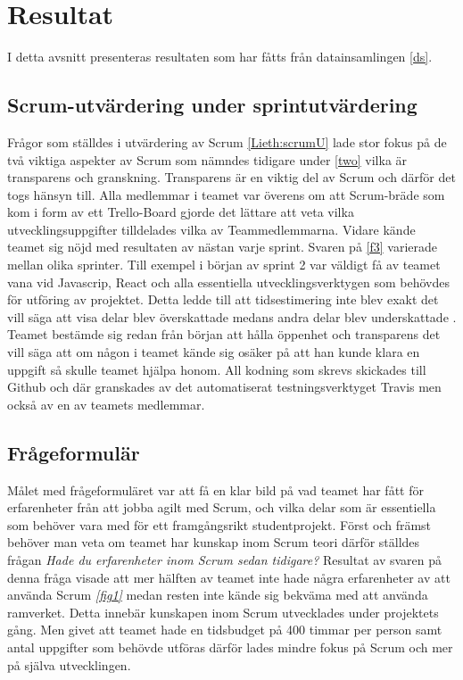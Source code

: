 \section{Resultat}
\label{sec:Lieth_Wahid-results}
I detta avsnitt presenteras resultaten som har fåtts från datainsamlingen \ref{ds}.
\subsection{Scrum-utvärdering under sprintutvärdering}
Frågor som ställdes i utvärdering av Scrum \ref{Lieth:scrumU} lade stor fokus på de två viktiga aspekter av Scrum som nämndes tidigare under \ref{two} vilka är transparens och granskning.
Transparens är en viktig del av Scrum och därför det togs hänsyn till. Alla medlemmar i teamet var överens om att Scrum-bräde som kom i form av ett Trello-Board gjorde det lättare att veta vilka 
utvecklingsuppgifter tilldelades vilka av Teammedlemmarna. Vidare kände teamet sig nöjd med resultaten av nästan varje sprint. Svaren på \ref{f3} varierade mellan olika sprinter. Till exempel i början av sprint 2 var väldigt få av teamet  
vana vid Javascrip, React och alla essentiella utvecklingsverktygen som behövdes för utföring av projektet. Detta ledde till att tidsestimering inte blev exakt det vill säga att visa delar blev överskattade medans andra delar blev underskattade  . Teamet bestämde sig redan från
början att hålla öppenhet och transparens det vill säga att om någon i teamet kände sig osäker på att han kunde klara en uppgift så skulle teamet hjälpa honom. All kodning som skrevs skickades till Github och där granskades av det automatiserat testningsverktyget Travis men också av en av teamets medlemmar.

\subsection{Frågeformulär}
Målet med frågeformuläret var att få en klar bild på vad teamet har fått för erfarenheter från att jobba agilt med Scrum, och vilka delar som är essentiella som behöver vara med för ett framgångsrikt studentprojekt. Först och främst behöver man veta om teamet har kunskap inom Scrum teori därför ställdes frågan \textit{Hade du erfarenheter inom Scrum sedan tidigare? } Resultat av svaren på denna fråga visade att mer hälften av teamet inte hade några erfarenheter av att använda Scrum \textit{ \ref{fig1} } medan resten inte kände sig bekväma med att använda ramverket. Detta innebär kunskapen inom Scrum utvecklades under projektets gång. Men givet att teamet hade en tidsbudget på 400 timmar per person samt antal uppgifter som behövde utföras därför lades mindre fokus på Scrum och mer på själva utvecklingen.  

